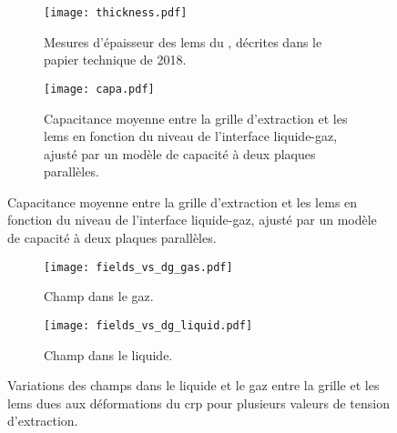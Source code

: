       \begin{figure}[htbp]
        \centering
        \begin{subfigure}[t]{0.48\textwidth}
          \centering
          \texttt{[image: thickness.pdf]}
          \caption[Mesures d'épaisseur des LEMs du \TOO{}]{\label{fig::lem_thicnkess_311}Mesures d'épaisseur des \glspl{lem} du \TOO{}, décrites dans le papier technique de 2018\cite{Aimard2018}.}
        \end{subfigure}\hfill
        \begin{subfigure}[t]{0.48\textwidth}
          \centering
          \texttt{[image: capa.pdf]}
          \caption[Capacitance moyenne entre la grille d'extraction et les LEMs en fonction du niveau de l'interface liquide-gaz]{\label{fig::capa}Capacitance moyenne entre la grille d'extraction et les \glspl{lem} en fonction du niveau de l'interface liquide-gaz, ajusté par un modèle de capacité à deux plaques parallèles.}
        \end{subfigure}
      \end{figure}


      \begin{figure}[htbp]
        \centering
        \begin{subfigure}[t]{0.48\textwidth}
          \centering
          \texttt{[image: fields\_vs\_dg\_gas.pdf]}
          \caption{Champ dans le gaz.}
        \end{subfigure}\hfill
        \begin{subfigure}[t]{0.48\textwidth}
          \centering
          \texttt{[image: fields\_vs\_dg\_liquid.pdf]}
          \caption{Champ dans le liquide.}
        \end{subfigure}
        \caption[Variations des champs d'extraction dues à la déformation du CRP]{\label{fig::fields_vs_dg}Variations des champs dans le liquide et le gaz entre la grille et les \glspl{lem} dues aux déformations du \gls{crp} pour plusieurs valeurs de tension d'extraction.}
      \end{figure}

